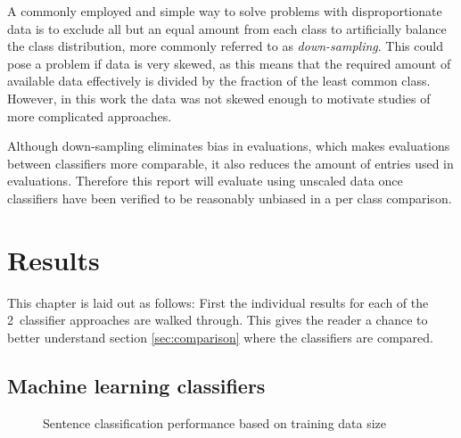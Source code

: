 \documentclass[a4paper,11pt]{kth-mag}
\newcommand{\numClassifierAproaches}{2}
\begin{document}
A commonly employed and simple way to solve problems with disproportionate data
is to exclude all but an equal amount from each class to artificially balance the class distribution,
more commonly referred to as \emph{down-sampling}\cite{provost2000machine}.
This could pose a problem if data is very skewed, as this means that the required
amount of available data effectively is divided by the fraction of the least common class.
However, in this work the data was not skewed enough to motivate studies of more
complicated approaches.

Although down-sampling eliminates bias in evaluations, which makes evaluations between
classifiers more comparable, it also reduces the amount of entries used in evaluations.
Therefore this report will evaluate using unscaled data once classifiers have been
verified to be reasonably unbiased in a per class comparison.



\section{Results}

This chapter is laid out as follows: First the individual results for each of the \numClassifierAproaches~classifier approaches are walked through. This gives the reader a chance to better understand section \ref{sec:comparison} where the classifiers are compared.


\subsection{Machine learning classifiers}

\begin{figure}[h]
  \centering

  \caption{Sentence classification performance based on training data size}
  \label{fig:data_size}
\end{figure}
\end{document}
